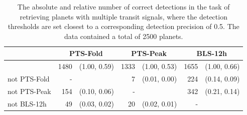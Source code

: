 \begin{table}[h]
\label{tab:single_AnotB}
\centering
\begin{tabular}{@{}lrlrlrl@{}}
\toprule
             & \multicolumn{2}{c}{PTS-Fold} & \multicolumn{2}{c}{PTS-Peak} & \multicolumn{2}{c}{BLS-12h} \\ \midrule
             & 1480      & (1.00, 0.59)     & 1333      & (1.00, 0.53)     & 1655     & (1.00, 0.66)     \\
not PTS-Fold & -         &                  & 7         & (0.01, 0.00)     & 224      & (0.14, 0.09)     \\
not PTS-Peak & 154       & (0.10, 0.06)     & -         &                  & 342      & (0.21, 0.14)     \\
not BLS-12h  & 49        & (0.03, 0.02)     & 20        & (0.02, 0.01)     & -        &                  \\ \bottomrule
\end{tabular}
\caption{The absolute and relative number of correct detections in the task of retrieving planets with multiple transit signals, where the detection thresholds are set closest to a corresponding detection precision of 0.5. The data contained a total of 2500 planets.}
\end{table}